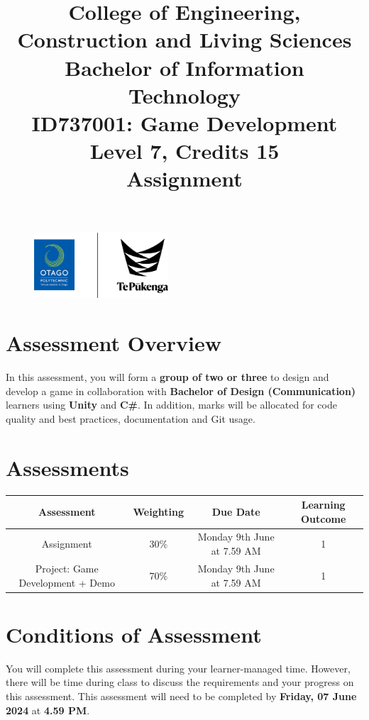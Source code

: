 \documentclass{article}
\author{}
\begin{document}
\begin{figure}
	\centering
	\includegraphics[width=50mm]{../../resources/img/logo.png}
\end{figure}

\title{College of Engineering, Construction and Living Sciences\\Bachelor of Information Technology\\ID737001: Game Development\\Level 7, Credits 15\\\textbf{Assignment}}
\date{}
\maketitle

\section*{Assessment Overview}
In this assessment, you will form a \textbf{group of two or three} to design and develop a game in collaboration with \textbf{Bachelor of Design (Communication)} learners using \textbf{Unity} and \textbf{C\#}. In addition, marks will be allocated for code quality and best practices, documentation and Git usage.

\section*{Assessments}
\renewcommand{\arraystretch}{1.5}
\begin{tabular}{|c|c|c|c|}
	\hline
	\textbf{Assessment}                                 & \textbf{Weighting} & \textbf{Due Date}            & \textbf{Learning Outcome} \\ \hline
	\small Assignment                 & \small 30\%        & \small Monday 9th June at 7.59 AM \small  & \small 1                   \\ \hline
	\small Project: Game Development + Demo                 & \small 70\%        & \small Monday 9th June at 7.59 AM \small  & \small 1                   \\ \hline
\end{tabular}

\section*{Conditions of Assessment}
You will complete this assessment during your learner-managed time. However, there will be time during class to discuss the requirements and your progress on this assessment. This assessment will need to be completed by \textbf{Friday, 07 June 2024} at \textbf{4.59 PM}. 
\end{document}
